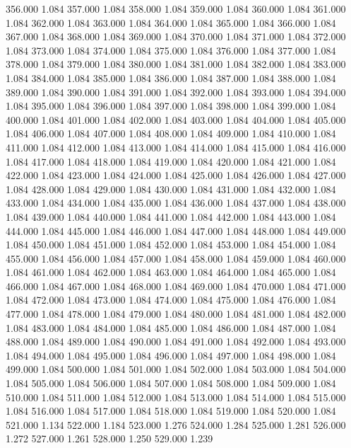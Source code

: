 356.000 1.084 
357.000 1.084 
358.000 1.084 
359.000 1.084 
360.000 1.084 
361.000 1.084 
362.000 1.084 
363.000 1.084 
364.000 1.084 
365.000 1.084 
366.000 1.084 
367.000 1.084 
368.000 1.084 
369.000 1.084 
370.000 1.084 
371.000 1.084 
372.000 1.084 
373.000 1.084 
374.000 1.084 
375.000 1.084 
376.000 1.084 
377.000 1.084 
378.000 1.084 
379.000 1.084 
380.000 1.084 
381.000 1.084 
382.000 1.084 
383.000 1.084 
384.000 1.084 
385.000 1.084 
386.000 1.084 
387.000 1.084 
388.000 1.084 
389.000 1.084 
390.000 1.084 
391.000 1.084 
392.000 1.084 
393.000 1.084 
394.000 1.084 
395.000 1.084 
396.000 1.084 
397.000 1.084 
398.000 1.084 
399.000 1.084 
400.000 1.084 
401.000 1.084 
402.000 1.084 
403.000 1.084 
404.000 1.084 
405.000 1.084 
406.000 1.084 
407.000 1.084 
408.000 1.084 
409.000 1.084 
410.000 1.084 
411.000 1.084 
412.000 1.084 
413.000 1.084 
414.000 1.084 
415.000 1.084 
416.000 1.084 
417.000 1.084 
418.000 1.084 
419.000 1.084 
420.000 1.084 
421.000 1.084 
422.000 1.084 
423.000 1.084 
424.000 1.084 
425.000 1.084 
426.000 1.084 
427.000 1.084 
428.000 1.084 
429.000 1.084 
430.000 1.084 
431.000 1.084 
432.000 1.084 
433.000 1.084 
434.000 1.084 
435.000 1.084 
436.000 1.084 
437.000 1.084 
438.000 1.084 
439.000 1.084 
440.000 1.084 
441.000 1.084 
442.000 1.084 
443.000 1.084 
444.000 1.084 
445.000 1.084 
446.000 1.084 
447.000 1.084 
448.000 1.084 
449.000 1.084 
450.000 1.084 
451.000 1.084 
452.000 1.084 
453.000 1.084 
454.000 1.084 
455.000 1.084 
456.000 1.084 
457.000 1.084 
458.000 1.084 
459.000 1.084 
460.000 1.084 
461.000 1.084 
462.000 1.084 
463.000 1.084 
464.000 1.084 
465.000 1.084 
466.000 1.084 
467.000 1.084 
468.000 1.084 
469.000 1.084 
470.000 1.084 
471.000 1.084 
472.000 1.084 
473.000 1.084 
474.000 1.084 
475.000 1.084 
476.000 1.084 
477.000 1.084 
478.000 1.084 
479.000 1.084 
480.000 1.084 
481.000 1.084 
482.000 1.084 
483.000 1.084 
484.000 1.084 
485.000 1.084 
486.000 1.084 
487.000 1.084 
488.000 1.084 
489.000 1.084 
490.000 1.084 
491.000 1.084 
492.000 1.084 
493.000 1.084 
494.000 1.084 
495.000 1.084 
496.000 1.084 
497.000 1.084 
498.000 1.084 
499.000 1.084 
500.000 1.084 
501.000 1.084 
502.000 1.084 
503.000 1.084 
504.000 1.084 
505.000 1.084 
506.000 1.084 
507.000 1.084 
508.000 1.084 
509.000 1.084 
510.000 1.084 
511.000 1.084 
512.000 1.084 
513.000 1.084 
514.000 1.084 
515.000 1.084 
516.000 1.084 
517.000 1.084 
518.000 1.084 
519.000 1.084 
520.000 1.084 
521.000 1.134 
522.000 1.184 
523.000 1.276 
524.000 1.284 
525.000 1.281 
526.000 1.272 
527.000 1.261 
528.000 1.250 
529.000 1.239 
